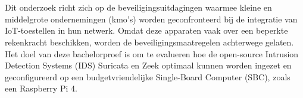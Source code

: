 
%
%
%
%
%

%



\chapter*{}

Dit onderzoek richt zich op de beveiligingsuitdagingen waarmee kleine en middelgrote ondernemingen (kmo's) worden geconfronteerd bij de integratie van IoT-toestellen in hun netwerk. Omdat deze apparaten vaak over een beperkte rekenkracht beschikken, worden de beveiligingsmaatregelen achterwege gelaten. Het doel van deze bachelorproef is om te evalueren hoe de open-source Intrusion Detection Systems (IDS) Suricata en Zeek optimaal kunnen worden ingezet en geconfigureerd op een budgetvriendelijke Single-Board Computer (SBC), zoals een Raspberry Pi 4.

